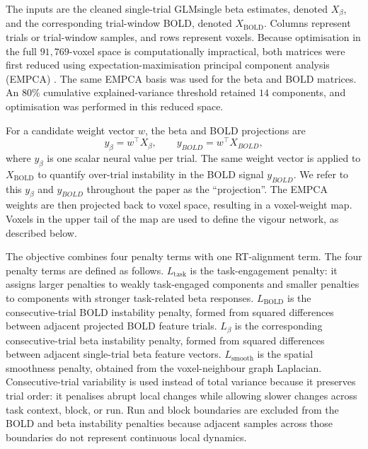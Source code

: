 \documentclass[utf8]{FrontiersinHarvard}
\begin{document}
The inputs are the cleaned single-trial GLMsingle beta estimates, denoted \(X_{\beta}\), and the corresponding trial-window BOLD, denoted \(X_{\mathrm{BOLD}}\). Columns represent trials or trial-window samples, and rows represent voxels. Because optimisation in the full \(91{,}769\)-voxel space is computationally impractical, both matrices were first reduced using expectation-maximisation principal component analysis (EMPCA) \citep{roweis1997algorithms}. The same EMPCA basis was used for the beta and BOLD matrices. An \(80\%\) cumulative explained-variance threshold retained \(14\) components, and optimisation was performed in this reduced space.

For a candidate weight vector \(w\), the beta and BOLD projections are
\begin{equation}
 y_{\beta}=w^{\top}X_{\beta}, 
 \qquad
 y_{BOLD}=w^{\top}X_{BOLD},
\end{equation}
where \(y_{\beta}\) is one scalar neural value per trial. The same weight vector is applied to \(X_{\mathrm{BOLD}}\) to quantify over-trial instability in the BOLD signal \(y_{BOLD}\). We refer to this \(y_{\beta}\) and \(y_{BOLD}\) throughout the paper as the ``projection''. The EMPCA weights are then projected back to voxel space, resulting in a voxel-weight map. Voxels in the upper tail of the map are used to define the vigour network, as described below.

The objective combines four penalty terms with one RT-alignment term. The four penalty terms are defined as follows. \(L_{\mathrm{task}}\) is the task-engagement penalty: it assigns larger penalties to weakly task-engaged components and smaller penalties to components with stronger task-related beta responses. \(L_{\mathrm{BOLD}}\) is the consecutive-trial BOLD instability penalty, formed from squared differences between adjacent projected BOLD feature trials. \(L_{\beta}\) is the corresponding consecutive-trial beta instability penalty, formed from squared differences between adjacent single-trial beta feature vectors. \(L_{\mathrm{smooth}}\) is the spatial smoothness penalty, obtained from the voxel-neighbour graph Laplacian. Consecutive-trial variability is used instead of total variance because it preserves trial order: it penalises abrupt local changes while allowing slower changes across task context, block, or run. Run and block boundaries are excluded from the BOLD and beta instability penalties because adjacent samples across those boundaries do not represent continuous local dynamics.
\end{document}
